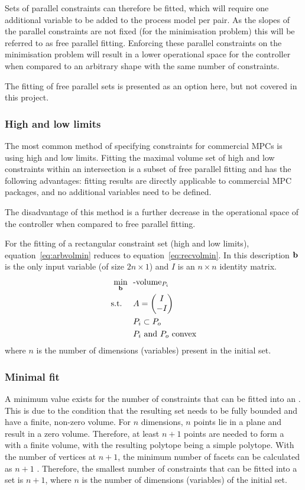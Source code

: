 Sets of parallel constraints can therefore be fitted, which will require one additional variable to be added to the process model per pair.
As the slopes of the parallel constraints are not fixed (for the minimisation problem) this will be referred to as free parallel fitting.
Enforcing these parallel constraints on the minimisation problem will result in a lower operational space for the controller when compared to an arbitrary shape with the same number of constraints.

The fitting of free parallel sets is presented as an option here, but not covered in this project.

\subsubsection{High and low limits}
The most common method of specifying constraints for commercial MPCs is using high and low limits.
Fitting the maximal volume set of high and low constraints within an intersection is a subset of free parallel fitting and has the following advantages: fitting results are directly applicable to commercial MPC packages, and no additional variables need to be defined.

The disadvantage of this method is a further decrease in the operational space of the controller when compared to free parallel fitting.

For the fitting of a rectangular constraint set (high and low limits), equation~\ref{eq:arbvolmin} reduces to equation~\ref{eq:recvolmin}.
In this description ${\bf {b}}$ is the only input variable (of size $2n \times 1$) and $I$ is an $n\times n$ identity matrix.
\begin{align}
  \label{eq:recvolmin}
    \min_{{\bf {b}}}~~&\text{-volume}_{P_i}\\
    \text{s.t.}~~~~ &A = \begin{pmatrix} I \\ -I \end{pmatrix} \notag \\
                    &P_i \subset P_o \notag \\
                    &P_i \text{~and~} P_o \text{~convex} \notag
\end{align}
where $n$ is the number of dimensions (variables) present in the initial set.

\subsubsection{Minimal fit}
A minimum value exists for the number of constraints that can be fitted into an \npoly.
This is due to the condition that the resulting set needs to be fully bounded and have a finite, non-zero volume.
For $n$ dimensions, $n$ points lie in a plane and result in a zero volume.
Therefore, at least $n+1$ points are needed to form a \npoly with a finite volume, with the resulting polytope being a simple polytope.
With the number of vertices at $n+1$, the minimum number of facets can be calculated as $n+1$ \citep{barnette}. 
Therefore, the smallest number of constraints that can be fitted into a set is $n+1$, where $n$ is the number of dimensions (variables) of the initial set.

